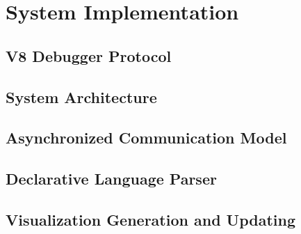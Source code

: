 \chapter {System Implementation}

\section {V8 Debugger Protocol}

\section {System Architecture}

\section {Asynchronized Communication Model}

\section {Declarative Language Parser}

\section {Visualization Generation and Updating}
